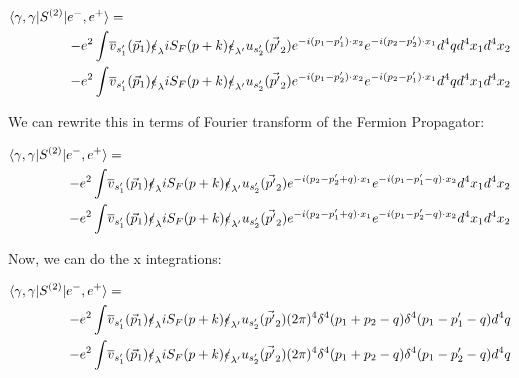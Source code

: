 \documentclass[a4]{article}
\begin{document}
\begin{framed}
            \begin{equation}
                \begin{aligned}
                    \langle \gamma, \gamma | S^{(2)} | e^{-}, e^{+} \rangle & = \\
                    -e^{2} \int & \overline{v}_{s'_1} (\vec{p}_1) \slashed{\epsilon}_{\lambda} i S_{F} (p + k) \slashed{\epsilon}_{\lambda'} u_{s'_2} (\vec{p'}_2) e^{- i (p_1 - p'_1) \cdot x_2} e^{- i (p_2 - p'_2) \cdot x_1} d^{4} q d^4 x_1 d^4 x_2 \\
                    -e^{2} \int & \overline{v}_{s'_1} (\vec{p}_1) \slashed{\epsilon}_{\lambda} i S_{F} (p + k) \slashed{\epsilon}_{\lambda'} u_{s'_2} (\vec{p'}_2) e^{- i (p_1 - p'_2) \cdot x_2} e^{- i (p_2 - p'_1) \cdot x_1} d^{4} q d^4 x_1 d^4 x_2
                \end{aligned}
            \end{equation}

            We can rewrite this in terms of Fourier transform of the Fermion Propagator:

            \begin{equation}
                \begin{aligned}
                    \langle \gamma, \gamma | S^{(2)} | e^{-}, e^{+} \rangle & = \\
                    -e^{2} \int & \overline{v}_{s'_1} (\vec{p}_1) \slashed{\epsilon}_{\lambda} i S_{F} (p + k) \slashed{\epsilon}_{\lambda'} u_{s'_2} (\vec{p'}_2) e^{- i (p_2 - p'_2 + q) \cdot x_1} e^{- i (p_1 - p'_1 - q) \cdot x_2} d^4 x_1 d^4 x_2 \\
                    -e^{2} \int & \overline{v}_{s'_1} (\vec{p}_1) \slashed{\epsilon}_{\lambda} i S_{F} (p + k) \slashed{\epsilon}_{\lambda'} u_{s'_2} (\vec{p'}_2) e^{- i (p_2 - p'_1 + q) \cdot x_1} e^{- i (p_1 - p'_2 - q) \cdot x_2} d^4 x_1 d^4 x_2
                \end{aligned}
            \end{equation}

            Now, we can do the x integrations:

            \begin{equation}
                \begin{aligned}
                    \langle \gamma, \gamma | S^{(2)} | e^{-}, e^{+} \rangle & = \\
                    -e^{2} \int & \overline{v}_{s'_1} (\vec{p}_1) \slashed{\epsilon}_{\lambda} i S_{F} (p + k) \slashed{\epsilon}_{\lambda'} u_{s'_2} (\vec{p'}_2) (2 \pi)^4 \delta^{4} (p_1 + p_2 - q) \delta^{4} (p_1 - p'_1 - q) d^{4} q \\
                    -e^{2} \int & \overline{v}_{s'_1} (\vec{p}_1) \slashed{\epsilon}_{\lambda} i S_{F} (p + k) \slashed{\epsilon}_{\lambda'} u_{s'_2} (\vec{p'}_2) (2 \pi)^4 \delta^{4} (p_1 + p_2 - q) \delta^{4} (p_1 - p'_2 - q) d^{4} q
                \end{aligned}
            \end{equation}


\end{framed}
\end{document}
